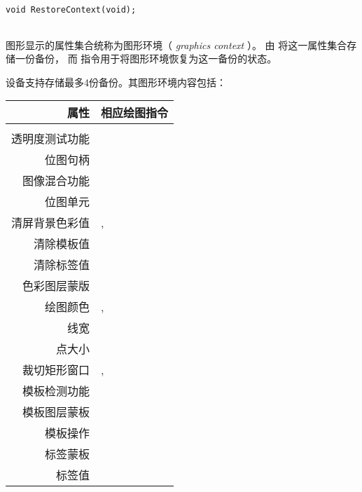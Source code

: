 
\begin{framed}
\begin{verbatim}
void RestoreContext(void);
\end{verbatim}
\end{framed}

\begin{tabular}{lp{}}

\end{tabular}

\vspace{10pt}
图形显示的属性集合统称为图形环境（ \textit{graphics context} ）。
由  将这一属性集合存储一份备份， 而  指令用于将图形环境恢复为这一备份的状态。

设备支持存储最多4份备份。其图形环境内容包括：
\vspace{10pt}

\begin{tabular}{rl}
属性 & 相应绘图指令 \\
\hline
\\
透明度测试功能   &  \nameref{AlphaFunc} \\
位图句柄         &  \nameref{BitmapHandle} \\
图像混合功能        &  \nameref{BlendFunc} \\
位图单元           &  \nameref{Cell} \\
清屏背景色彩值     & \nameref{ClearColorA}, \nameref{ClearColorRGB} \\
清除模板值   & \nameref{ClearStencil} \\
清除标签值       & \nameref{ClearTag} \\
色彩图层蒙版      & \nameref{ColorMask} \\
绘图颜色                 & \nameref{ColorA}, \nameref{ColorRGB} \\
线宽            & \nameref{LineWidth} \\
点大小            & \nameref{PointSize} \\
裁切矩形窗口     & \nameref{ScissorSize}, \nameref{ScissorXY} \\
模板检测功能 & \nameref{StencilFunc} \\
模板图层蒙板    & \nameref{StencilMask} \\
模板操作     & \nameref{StencilOp} \\
标签蒙板        & \nameref{TagMask} \\
标签值             & \nameref{Tag}
\end{tabular}



